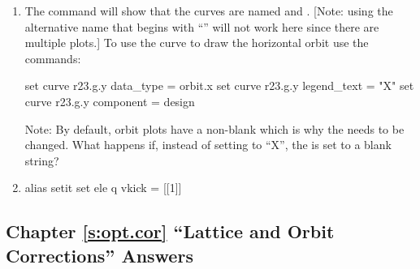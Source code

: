 \documentclass{hitec}     %
\begin{document}
\begin{enumerate}[label=\ref*{s:three.lat}.\arabic{enumi}]
\item
The  command will show that the curves are named  and
. [Note: using the alternative name that begins with ``'' will not work here
since there are multiple  plots.] To use the  curve to draw the 
horizontal orbit use the commands:
\begin{code}
set curve r23.g.y data_type = orbit.x
set curve r23.g.y legend_text = "X"
set curve r23.g.y component = design
\end{code}
Note: By default, orbit plots have a non-blank  which is why the  needs to be changed.
What happens if, instead of setting to ``X'', the  is set to a blank string?
%
\item
\begin{code}
alias setit set ele q vkick = [[1]]
\end{code}
\end{enumerate}

%

\subsection[Chapter \ref*{s:opt.corr.ex} ``Lattice Correction'']{Chapter \hyperref[s:opt.corr.ex]{\ref*{s:opt.cor}} ``Lattice and Orbit Corrections'' Answers}
\label{s:ans.corr}
\end{document}
